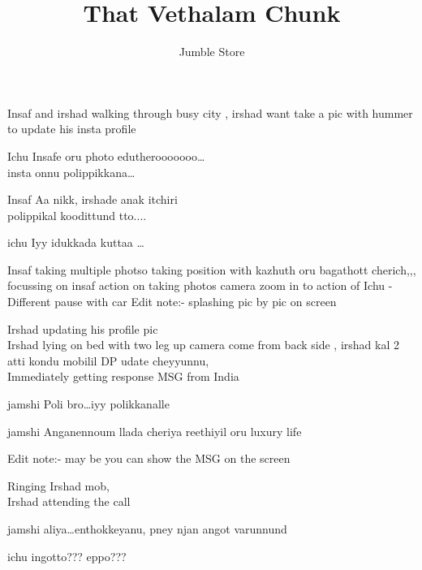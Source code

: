 \documentclass{screenplay}[2012/06/30]
\title{That Vethalam Chunk}
\author{Jumble Store}
\begin{document}
\coverpage

\fadein

Insaf and irshad walking through busy city , irshad want take a pic with hummer to update his insta profile

\begin{dialogue}{Ichu}
Insafe oru photo edutherooooooo\ldots \\
insta onnu polippikkana\ldots
\end{dialogue}


\begin{dialogue}{Insaf}
Aa nikk, irshade anak itchiri \\
polippikal koodittund tto....
\end{dialogue}

\begin{dialogue}{ichu}
Iyy idukkada kuttaa \ldots
\end{dialogue}

Insaf taking multiple  photso taking position with kazhuth oru bagathott cherich,,, focussing on insaf action on taking photos 
camera zoom in to action of Ichu -Different pause with car
Edit note:- splashing pic by pic on screen



Irshad updating his profile pic  \\
Irshad lying on bed with two leg up camera come from back side , irshad kal 2 atti kondu mobilil DP udate cheyyunnu, \\
Immediately getting response MSG from India

\begin{dialogue}{jamshi}
Poli bro\ldots iyy polikkanalle 
\end{dialogue}

\begin{dialogue}{jamshi}
Anganennoum llada cheriya reethiyil oru luxury life
\end{dialogue}

Edit note:- may be you can show the MSG on the screen

Ringing Irshad mob,\\
Irshad attending the call


\begin{dialogue}{jamshi}
aliya\ldots enthokkeyanu, pney njan angot varunnund
\end{dialogue}

\begin{dialogue}{ichu}
ingotto??? eppo???
\end{dialogue}
\end{document}
